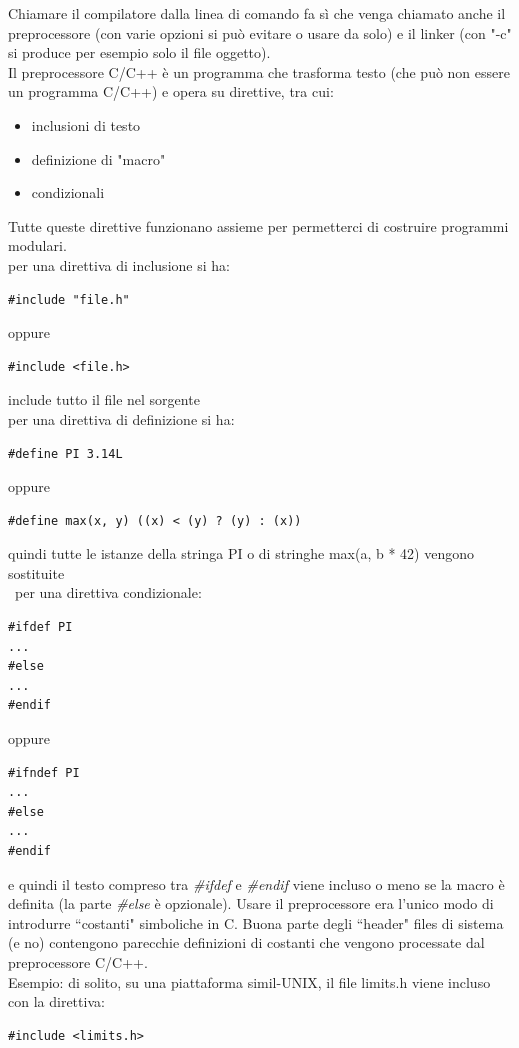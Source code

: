 \documentclass[a4paper,12pt, oneside]{book}
\begin{document}
Chiamare il compilatore dalla linea di comando fa sì
che venga chiamato anche il preprocessore (con varie opzioni si può evitare o usare da solo) e il linker (con "-c" si produce per esempio solo il file oggetto).\\
Il preprocessore C/C++ è un programma che trasforma testo (che può non essere un programma C/C++) e opera su direttive, tra cui:
\begin{itemize}
\item inclusioni di testo
\item definizione di "macro"
\item condizionali
\end{itemize}
Tutte queste direttive funzionano assieme per permetterci di
costruire programmi modulari.\\
per una direttiva di inclusione si ha:
\begin{verbatim}
#include "file.h"
\end{verbatim}
oppure 
\begin{verbatim}
#include <file.h>
\end{verbatim}
include tutto il file nel sorgente\\
per una direttiva di definizione si ha:
\begin{verbatim}
#define PI 3.14L
\end{verbatim}
oppure 
\begin{verbatim}
#define max(x, y) ((x) < (y) ? (y) : (x))
\end{verbatim}
quindi tutte le istanze della stringa PI o di stringhe max(a, b * 42) vengono sostituite\\\
per una direttiva condizionale:
\begin{verbatim}
#ifdef PI
...
#else
...
#endif
\end{verbatim}
oppure 
\begin{verbatim}
#ifndef PI
...
#else
...
#endif
\end{verbatim}
e quindi il testo compreso tra \textit{\#ifdef} e\textit{ \#endif }viene incluso o meno se la
macro è definita (la parte\textit{ \#else} è opzionale).
\newpage
Usare il preprocessore era l’unico modo di introdurre “costanti" simboliche in C. Buona parte degli “header" files di sistema (e no) contengono parecchie
definizioni di costanti che vengono processate dal preprocessore C/C++.
\\
Esempio: di solito, su una piattaforma simil-UNIX, il file limits.h
viene incluso con la direttiva:
\begin{verbatim}
#include <limits.h>
\end{verbatim}
\end{document}
